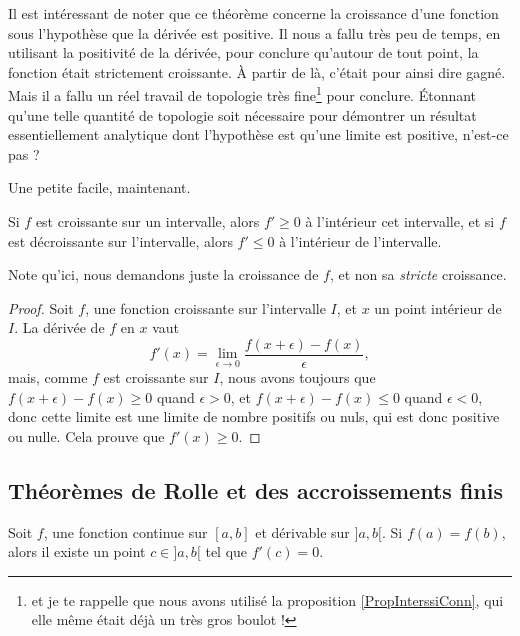 Il est intéressant de noter que ce théorème concerne la croissance d'une fonction sous l'hypothèse que la dérivée est positive. Il nous a fallu très peu de temps, en utilisant la positivité de la dérivée, pour conclure qu'autour de tout point, la fonction était strictement croissante. À partir de là, c'était pour ainsi dire gagné. Mais il a fallu un réel travail de topologie très fine\footnote{et je te rappelle que nous avons utilisé la proposition \ref{PropInterssiConn}, qui elle même était déjà un très gros boulot !} pour conclure. Étonnant qu'une telle quantité de topologie soit nécessaire pour démontrer un résultat essentiellement analytique dont l'hypothèse est qu'une limite est positive, n'est-ce pas ? 

Une petite facile, maintenant.
\begin{proposition}
    Si $f$ est croissante sur un intervalle, alors $f'\geq 0$ à l'intérieur cet intervalle, et si $f$ est décroissante sur l'intervalle, alors $f'\leq 0$ à l'intérieur de l'intervalle.
\end{proposition}

Note qu'ici, nous demandons juste la croissance de $f$, et non sa \emph{stricte} croissance.

\begin{proof}
    Soit $f$, une fonction croissante sur l'intervalle $I$, et $x$ un point intérieur de $I$. La dérivée de $f$ en $x$ vaut
    \begin{equation}
        f'(x)=\lim_{\epsilon\to 0}\frac{ f(x+\epsilon)-f(x) }{\epsilon},
    \end{equation}
    mais, comme $f$ est croissante sur $I$, nous avons toujours que $f(x+\epsilon)-f(x)\geq0$ quand $\epsilon>0$, et $f(x+\epsilon)-f(x)\leq0$ quand $\epsilon<0$, donc cette limite est une limite de nombre positifs ou nuls, qui est donc positive ou nulle. Cela prouve que $f'(x)\geq 0$.
\end{proof}

\subsection{Théorèmes de Rolle et des accroissements finis}

\begin{theorem}       \label{ThoRolle}
    Soit $f$, une fonction continue sur $[a,b]$ et dérivable sur $]a,b[$. Si $f(a)=f(b)$, alors il existe un point $c\in]a,b[$ tel que $f'(c)=0$.
\end{theorem}

